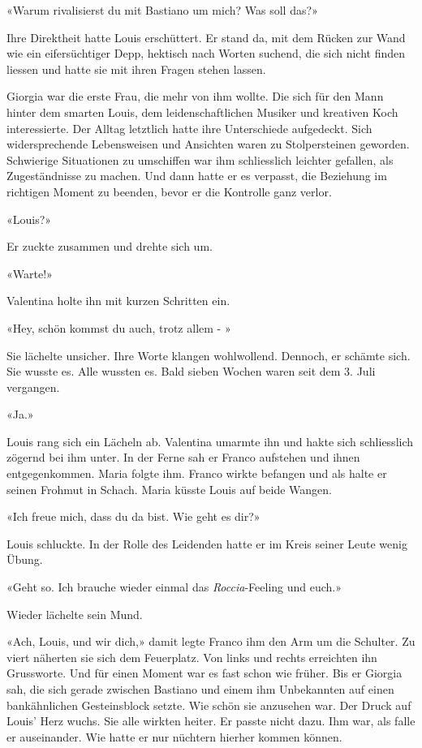 «Warum rivalisierst du mit Bastiano um mich? Was soll das?»

Ihre Direktheit hatte Louis erschüttert. Er stand da, mit dem Rücken zur Wand wie ein eifersüchtiger Depp, hektisch nach Worten suchend, die sich nicht finden liessen und hatte sie mit ihren Fragen stehen lassen. 

Giorgia war die erste Frau, die mehr von ihm wollte.
Die sich für den Mann hinter dem smarten Louis, dem
leidenschaftlichen Musiker und kreativen Koch interessierte. Der Alltag letztlich hatte ihre Unterschiede aufgedeckt. Sich
widersprechende Lebensweisen und Ansichten waren zu Stolpersteinen geworden. 
Schwierige Situationen zu umschiffen war ihm schliesslich leichter gefallen, als Zugeständnisse zu machen. Und dann hatte er es verpasst,
die Beziehung im richtigen Moment zu beenden, bevor er die Kontrolle ganz verlor.

\sectionbreak

«Louis?»

Er zuckte zusammen und drehte sich um.

«Warte!»

Valentina holte ihn mit kurzen Schritten ein.

«Hey, schön kommst du auch, trotz allem - »

Sie lächelte unsicher. Ihre Worte klangen wohlwollend. Dennoch, er schämte sich. Sie wusste es. Alle wussten es.
Bald sieben Wochen waren seit dem 3. Juli vergangen. 

«Ja.»

Louis rang sich ein Lächeln ab.
Valentina umarmte ihn und hakte sich schliesslich zögernd bei ihm unter. In der Ferne sah er Franco aufstehen und ihnen entgegenkommen. Maria
folgte ihm. Franco wirkte befangen und als halte er seinen Frohmut in
Schach. Maria küsste Louis auf beide Wangen.

«Ich freue mich, dass du da bist. Wie geht es dir?»

Louis schluckte. In der Rolle des Leidenden hatte er im Kreis seiner
Leute wenig Übung.

«Geht so. Ich brauche wieder einmal das \emph{Roccia}-Feeling und euch.»

Wieder lächelte sein Mund.

«Ach, Louis, und wir dich,» damit legte Franco ihm den Arm um die
Schulter. Zu viert näherten sie sich dem Feuerplatz. Von links und rechts erreichten ihn Grussworte. Und für einen Moment war es fast schon wie früher. Bis er Giorgia sah, die sich gerade zwischen Bastiano und einem ihm 
Unbekannten auf einen bankähnlichen Gesteinsblock setzte. Wie
schön sie anzusehen war.
Der Druck auf Louis’ Herz wuchs. Sie alle wirkten heiter. Er passte nicht dazu. Ihm war, als falle er auseinander. 
Wie hatte er nur nüchtern hierher kommen können. 

